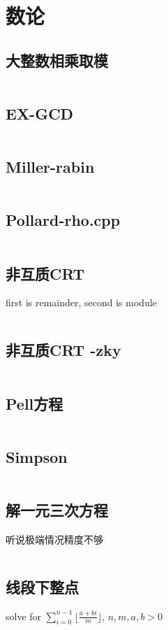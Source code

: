 \chapter{数论}
\section{大整数相乘取模}
\inputminted{cpp}{\source/number-theory/biginteger-multiply.cpp}
\section{EX-GCD}
\inputminted{cpp}{\source/number-theory/extended-euclid.cpp}
\section{Miller-rabin}
\inputminted{cpp}{\source/number-theory/miller-rabin.cpp}
\section{Pollard-rho.cpp}
\inputminted{cpp}{\source/number-theory/pollard-rho.cpp}
\section{非互质CRT}
first is remainder, second is module
\inputminted{cpp}{\source/number-theory/CRT.cpp}
\section{非互质CRT -zky}
\inputminted{cpp}{\source/number-theory/CRT-zky.cpp}
\section{Pell方程}
\inputminted{cpp}{\source/number-theory/Pell.cpp}
\section{Simpson}
\inputminted{cpp}{\source/number-theory/Simpson.cpp}
\section{解一元三次方程}
听说极端情况精度不够
\inputminted{cpp}{\source/number-theory/解一元三次方程.cpp}
\section{线段下整点}
solve for $\sum_{i=0}^{n-1} \lfloor \frac{a+bi}{m}\rfloor$, $n,m,a,b>0$
\inputminted{cpp}{\source/number-theory/integer-lattice-under-segment.cpp}
